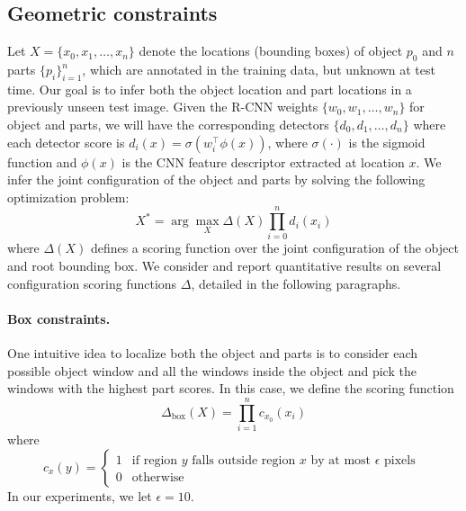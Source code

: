 \subsection{Geometric constraints}
Let $X =\{x_0, x_1, \ldots, x_n\}$ denote the locations (bounding boxes) of object $p_0$ and $n$ parts $\{p_i\}_{i=1}^n$, which are annotated in the training data, but unknown at test time. Our goal is to infer both the object location and part locations in a previously unseen test image. Given the R-CNN  weights $\{w_0, w_1, \ldots, w_n\}$ for object and parts, we will have the corresponding detectors $\{d_0, d_1, \ldots, d_n\}$ where each detector score is $d_i(x) = \sigma(w_i^{\intercal} \phi(x))$, where $\sigma(\cdot)$ is the sigmoid function and $\phi(x)$ is the CNN feature descriptor extracted at location $x$.
We infer the joint configuration of the object and parts by solving the following optimization problem:
\begin{equation}
X^* = \arg \max_{X}
\Delta(X)
\prod_{i=0}^n d_i(x_i)
\end{equation}
where $\Delta(X)$ defines a scoring function over the joint configuration of the object and root bounding box.
We consider and report quantitative results on several configuration scoring functions $\Delta$, detailed in the following paragraphs.


\paragraph{Box constraints.}
One intuitive idea to localize both the object and parts is to consider each possible object window and all the windows inside the object and pick the windows with the highest part scores.
In this case, we define the scoring function
\begin{equation}
\Delta_{\mathrm{box}}(X) = \prod_{i=1}^n c_{x_0}(x_i)
\end{equation}
where
\begin{equation}
c_x(y) =
\left\{
\begin{array}{ll}
1 & \text{if region } y \text{ falls outside region } x \text{ by at most } \epsilon \text{ pixels }\\
0 & \text{otherwise}
\end{array}
\right.
\end{equation}
In our experiments, we let $\epsilon = 10$.

